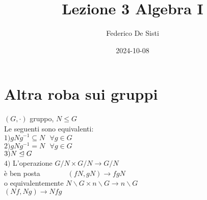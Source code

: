\documentclass[12px]{article}
\title{Lezione 3 Algebra I}
\date{2024-10-08}
\author{Federico De Sisti}
\begin{document}
	\maketitle
	\newpage
	\section{Altra roba sui gruppi}
	\begin{prop}
		$(G,\cdot)$ gruppo, $N\leq G$\\ 
		Le seguenti sono equivalenti:\\
		$1) gNg^{-1}\subseteq N \ \ \ \forall g\in G$\\
		$2) gNg^{-1} = N \ \ \ \forall g\in G$\\
		$3) N\trianglelefteq G$\\ 
		 $4)$ L'operazione $G/N\times G/N \rightarrow G/N$ \\
		 è ben posta \ \ \ \ \ \ \ $(fN,gN) \rightarrow fgN$ \\
		 o equivalentemente $N\backslash G\times n\backslash G \rightarrow n\backslash G$\\
		 \text{} \hspace{90px} $(Nf,Ng) \rightarrow Nfg$

	\end{prop}
\end{document}
